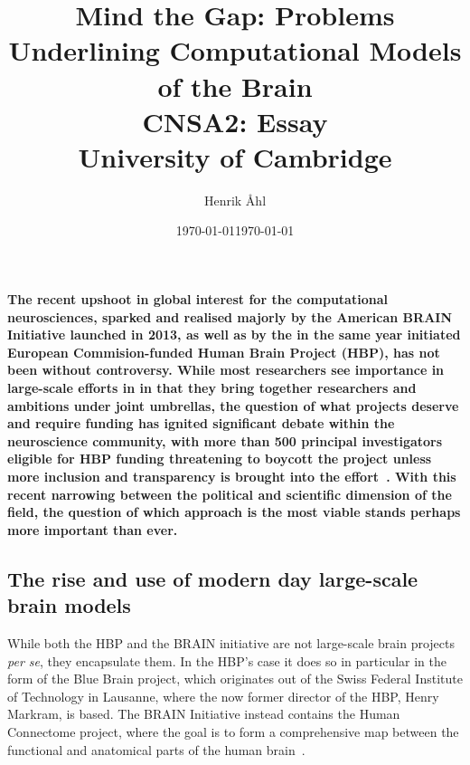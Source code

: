 \documentclass[10pt]{article}\usepackage[]{graphicx}\usepackage[]{color}
\title{
  \bf Mind the Gap: Problems Underlining Computational Models of the Brain\\[1em]
  \small
  {{CNSA2: Essay} \\[1em]
  University of Cambridge}
}
\author{Henrik Åhl}
\date{\today}
\theoremstyle{plain}
\begin{document}
\date{\today}
\maketitle
\setcounter{page}{1}
        

\maketitle
\begin{multicols*}{2}
	\paragraph[Introduction]{\bf 
		The recent upshoot in global interest for the computational neurosciences, sparked and realised majorly by the American BRAIN Initiative launched in 2013, as well as by the in the same year initiated European Commision-funded Human Brain Project (HBP), has not been without controversy. While most researchers see importance in large-scale efforts in in that they bring together researchers and ambitions under joint umbrellas, the question of what projects deserve and require funding has ignited significant debate within the neuroscience community, with more than 500 principal investigators eligible for HBP funding threatening to boycott the project unless more inclusion and transparency is brought into the effort~\cite{neurofuture}. With this recent narrowing between the political and scientific dimension of the field, the question of which approach is the most viable stands perhaps more important than ever.
	}
					        
	\subsection*{The rise and use of modern day large-scale brain models}
	While both the HBP and the BRAIN initiative are not large-scale brain projects \textit{per se}, they encapsulate them. In the HBP's case it does so in particular in the form of the Blue Brain project, which originates out of the Swiss Federal Institute of Technology in Lausanne, where the now former director of the HBP, Henry Markram, is based. The BRAIN Initiative instead contains the Human Connectome project, where the goal is to form a comprehensive map between the functional and anatomical parts of the human brain~\cite{geddes_2017}.  
	

\end{multicols*}
\end{document}
